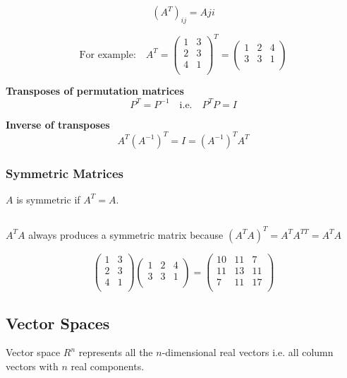 \documentclass[12pt]{article}
\begin{document}
\[
    (A^T)_{ij}=Aji
\]

\[
\text{For example:}
\quad
A^T=
\left(
    \begin{matrix}
        1 & 3\\
        2 & 3\\
        4 & 1\\
    \end{matrix}
\right)^T
=
\left(
    \begin{matrix}
        1 & 2 & 4\\
        3 & 3 & 1\\
    \end{matrix}
\right)
\]

\textbf{Transposes of permutation matrices}
\[P^T = P^{-1} \quad \text{i.e.} \quad P^TP = I\]

\textbf{Inverse of transposes}
\[A^T(A^{-1})^T = I = (A^{-1})^TA^T\]

\subsubsection{Symmetric Matrices}

$A$ is symmetric if $A^T=A$. 

$\>$

$A^TA$ always produces a symmetric matrix because $(A^TA)^T = A^TA^{TT} = A^TA$

\[
\left(
    \begin{matrix}
        1 & 3\\
        2 & 3\\
        4 & 1\\
    \end{matrix}
\right)
\left(
    \begin{matrix}
        1 & 2 & 4\\
        3 & 3 & 1\\
    \end{matrix}
\right)
=
\left(
    \begin{matrix}
        10 & 11 & 7\\
        11 & 13 & 11\\
        7 & 11 & 17\\
    \end{matrix}
\right)
\]

\subsection{Vector Spaces}

Vector space $R^n$ represents all the $n$-dimensional real vectors i.e. all column vectors with $n$ real components.
\end{document}
